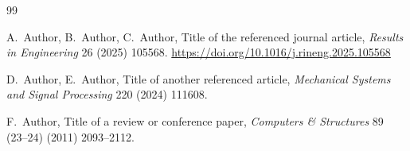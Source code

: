 \documentclass[final,5p,times,twocolumn]{elsarticle}
\begin{document}
\begin{thebibliography}{99}

A.~Author, B.~Author, C.~Author,
Title of the referenced journal article,
\textit{Results in Engineering} 26 (2025) 105568.
\url{https://doi.org/10.1016/j.rineng.2025.105568}

D.~Author, E.~Author,
Title of another referenced article,
\textit{Mechanical Systems and Signal Processing} 220 (2024) 111608.

F.~Author,
Title of a review or conference paper,
\textit{Computers \& Structures} 89 (23--24) (2011) 2093--2112.

\end{thebibliography}
\end{document}
